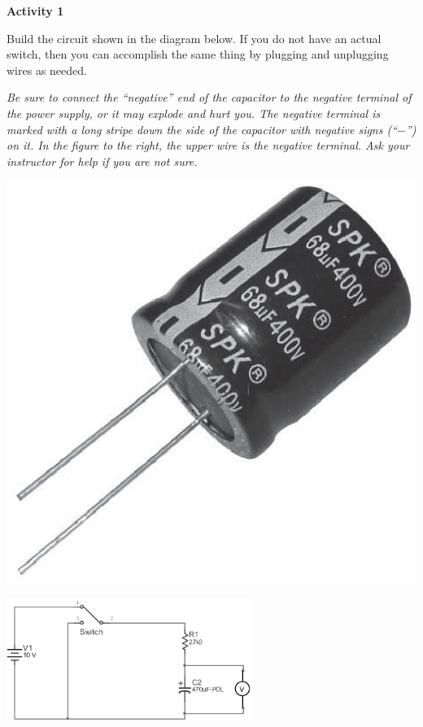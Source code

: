 \textbf{Activity 1}

Build the circuit shown in the diagram below.  If you do not have an actual switch, then you can accomplish the same thing by plugging and unplugging wires as needed.

\begin{minipage}{0.83\textwidth}
\begin{newboxed}
\vspace{-0.2 in}
\textit{Be sure to connect the “negative” end of the capacitor to the negative terminal of the power supply, or it may explode and hurt you.  The negative terminal is marked with a long stripe down the side of the capacitor with negative signs (``$-$'') on it.  In the figure to the right, the upper wire is the negative terminal. Ask your instructor for help if you are not sure.}
\vspace{-0.1 in}
\end{newboxed}
\end{minipage}
\begin{minipage}{0.17\textwidth}
\includegraphics[width=1.0\textwidth]{rc_circuits/capacitor_bw.eps}
\end{minipage}

\begin{center}
\vspace{-0.3 in}
\includegraphics[width=0.6\textwidth]{rc_circuits/circuit_diagram_bw.eps}
\vspace{-0.2 in}
\end{center}

